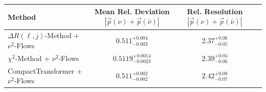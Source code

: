     \begin{tabular}{lccc}
        \toprule
        Method & Mean Rel. Deviation $|\vec{p}(\nu) + \vec{p}(\bar{\nu})|$ & Rel. Resolution $|\vec{p}(\nu) + \vec{p}(\bar{\nu})|$ \\
        \midrule
        $\Delta R(\ell,j)$-Method + $\nu^2$-Flows & $0.511^{+0.004}_{-0.002}$ & $2.37^{+0.06}_{-0.05}$ \\
        $\chi^2$-Method + $\nu^2$-Flows & $0.5119^{+0.0014}_{-0.0023}$ & $2.39^{+0.04}_{-0.06}$ \\
        CompactTransformer + $\nu^2$-Flows & $0.511^{+0.002}_{-0.002}$ & $2.42^{+0.08}_{-0.07}$ \\
        \bottomrule
    \end{tabular}